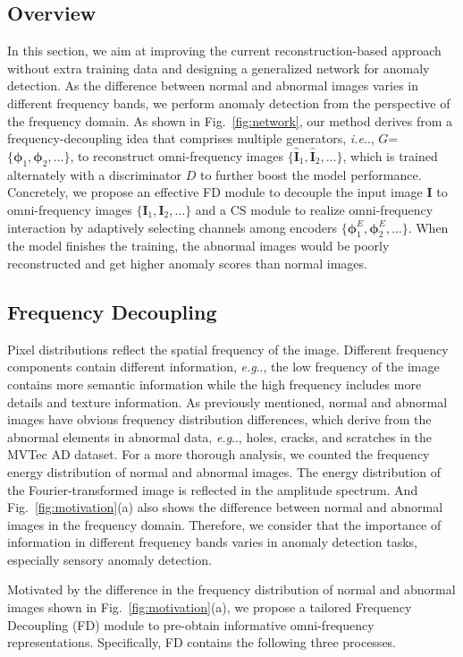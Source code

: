 \documentclass[lettersize,journal]{IEEEtran}
\makeatletter
\DeclareRobustCommand\onedot{\futurelet\@let@token\@onedot}
\def\@onedot{\ifx\@let@token.\else.\null\fi\xspace}
\def\eg{\emph{e.g}\onedot} \def\Eg{\emph{E.g}\onedot}
\def\ie{\emph{i.e}\onedot} \def\Ie{\emph{I.e}\onedot}
\makeatother
\begin{document}
\subsection{Overview}
In this section, we aim at improving the current reconstruction-based approach without extra training data and designing a generalized network for anomaly detection. As the difference between normal and abnormal images varies in different frequency bands, we perform anomaly detection from the perspective of the frequency domain. As shown in Fig.~\ref{fig:network}, our method derives from a frequency-decoupling idea that comprises multiple generators, \ie, $G$=$\{\bm{\phi}_1, \bm{\phi}_2, \dots\}$, to reconstruct omni-frequency images $\{\hat{\bm{I}}_1, \hat{\bm{I}}_2, \dots\}$, which is trained alternately with a discriminator $D$ to further boost the model performance. Concretely, we propose an effective FD module to decouple the input image $\bm{I}$ to omni-frequency images $\{\bm{I}_1, \bm{I}_2, \dots\}$ and a CS module to realize omni-frequency interaction by adaptively selecting channels among encoders $\{\bm{\phi}_1^E, \bm{\phi}_2^E, \dots\}$. When the model finishes the training, the abnormal images would be poorly reconstructed and get higher anomaly scores than normal images. 
\subsection{Frequency Decoupling}
Pixel distributions reflect the spatial frequency of the image. Different frequency components contain different information, \eg, the low frequency of the image contains more semantic information while the high frequency includes more details and texture information. As previously mentioned, normal and abnormal images have obvious frequency distribution differences, which derive from the abnormal elements in abnormal data, \eg, holes, cracks, and scratches in the MVTec AD dataset. For a more thorough analysis, we counted the frequency energy distribution of normal and abnormal images. The energy distribution of the Fourier-transformed image is reflected in the amplitude spectrum. And Fig.~\ref{fig:motivation}(a) also shows the difference between normal and abnormal images in the frequency domain. Therefore, we consider that the importance of information in different frequency bands varies in anomaly detection tasks, especially sensory anomaly detection.

Motivated by the difference in the frequency distribution of normal and abnormal images shown in Fig.~\ref{fig:motivation}(a), we propose a tailored Frequency Decoupling (FD) module to pre-obtain informative omni-frequency representations. Specifically, FD contains the following three processes. 
\end{document}
